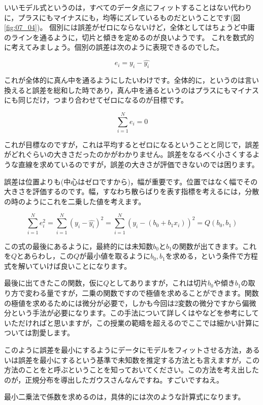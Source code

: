 \documentclass{ltjbook}
\begin{document}
いいモデル式というのは，すべてのデータ点にフィットすることはない代わりに，プラスにもマイナスにも，均等にズレているものだということです(図\ref{fig:07_04})。
個別には誤差がゼロにならないけど，全体としてはちょうど中庸のラインを通るように，切片と傾きを定めるのが良いようです。
これを数式的に考えてみましょう。個別の誤差は次のように表現できるのでした。

\[e_i = y_i - \hat{y_i} \]

これが全体的に真ん中を通るようにしたいわけです。全体的に，というのは言い換えると誤差を総和した時であり，真ん中を通るというのはプラスにもマイナスにも同じだけ，つまり合わせてゼロになるのが目標です。

\[\sum_{i=1}^N e_i = 0 \]

これが目標なのですが，これは平均するとゼロになるということと同じで，誤差がどれぐらいの大きさだったのかがわかりません。誤差をなるべく小さくするような直線を求めているのですが，誤差の大きさが評価できないのでは困ります。

誤差は位置よりも(中心はゼロですから)，幅が重要です。位置ではなく幅でその大きさを評価するのです。幅，すなわち散らばりを表す指標を考えるには，分散の時のようにこれを二乗した値を考えます。

\[\sum_{i=1}^N e_i^2=\sum_{i=1}^N (y_i - \hat{y_i})^2 = \sum_{i=1}^N (y_i - (b_0 + b_1x_i))^2=Q(b_0,b_1) \]

この式の最後にあるように，最終的には未知数$b_0$と$b_1$の関数が出てきます。これを$Q$とあらわし，この$Q$が最小値を取るように$b_0,b_1$を求める，という条件で方程式を解いていけば良いことになります。

最後に出てきたこの関数，仮に$Q$としてありますが，これは切片$b_0$や傾き$b_1$の取り方で変わる量ですが，二乗の関数ですので極値を求めることができます。関数の極値を求めるためには微分が必要で，しかも今回は2変数の微分ですから偏微分という手法が必要になります。この手法について詳しくは\textcite{kosugi2018}や\textcite{Nishiuchi201712}などを参考にしていただければと思いますが，この授業の範疇を超えるのでここでは細かい計算については割愛します。

このように誤差を最小にするようにデータにモデルをフィットさせる方法，あるいは誤差を最小にするという基準で未知数を推定する方法とも言えますが，この方法のことをと呼ぶということを知っておいてください。この方法を考え出したのが，正規分布を導出したガウスさんなんですね。すごいですねえ。

最小二乗法で係数を求めるのは，具体的には次のような計算式になります。
\end{document}
